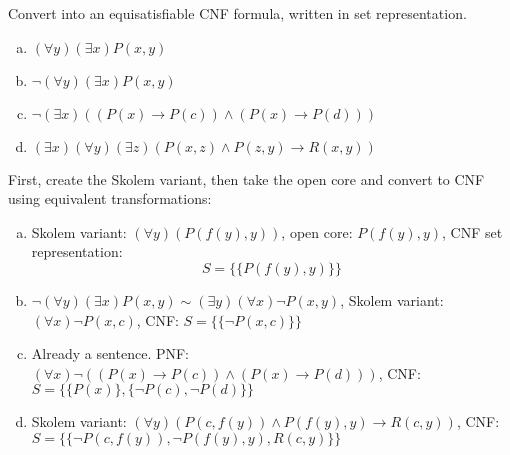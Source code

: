 \begin{problem} 
    
    Convert into an equisatisfiable CNF formula, written in set representation.

    \begin{enumerate}[(a)]
        \item $(\forall y)(\exists x)P(x,y)$
        \item $\neg (\forall y)(\exists x)P(x,y)$
        \item $\neg (\exists x)((P(x)\to P(c))\wedge (P(x)\to P(d)))$
        \item $(\exists x)(\forall y)(\exists z)(P(x,z)\wedge P(z,y) \to R(x,y))$
    \end{enumerate}

    \begin{solution}
        First, create the Skolem variant, then take the open core and convert to CNF using equivalent transformations:
        \begin{enumerate}[(a)]
            \item Skolem variant: $(\forall y)(P(f(y),y))$, open core: $P(f(y),y)$, CNF set representation: 
            $$
            S=\{\{P(f(y),y)\}\}
            $$
            \item $\neg (\forall y)(\exists x)P(x,y)\sim(\exists y)(\forall x)\neg P(x,y)$, Skolem variant: $(\forall x)\neg P(x,c)$, CNF: $S=\{\{\neg P(x,c)\}\}$
            \item Already a sentence. PNF: $(\forall x)\neg((P(x)\to P(c))\wedge (P(x)\to P(d)))$, CNF: $S=\{\{P(x)\},\{\neg P(c),\neg P(d)\}\}$
            \item Skolem variant: $(\forall y)(P(c,f(y))\wedge P(f(y),y) \to R(c,y))$, CNF: $S=\{\{\neg P(c,f(y)),\neg P(f(y),y), R(c,y)\}\}$
        \end{enumerate}
    \end{solution}

\end{problem}


